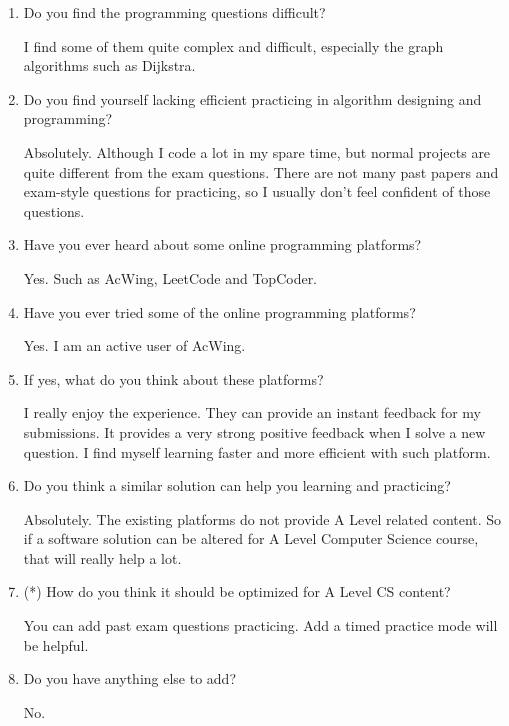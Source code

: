 \documentclass[a4paper]{report}
\begin{document}
\begin{enumerate}
    \item Do you find the programming questions difficult?

          I find some of them quite complex and difficult, especially the graph algorithms such as Dijkstra.

    \item Do you find yourself lacking efficient practicing in algorithm designing and programming?

          Absolutely. Although I code a lot in my spare time, but normal projects are quite different from the exam questions. There are not many past papers and exam-style questions for practicing, so I usually don't feel confident of those questions.

    \item Have you ever heard about some online programming platforms?

          Yes. Such as AcWing, LeetCode and TopCoder.

    \item Have you ever tried some of the online programming platforms?

          Yes. I am an active user of AcWing.

    \item If yes, what do you think about these platforms?

          I really enjoy the experience. They can provide an instant feedback for my submissions. It provides a very strong positive feedback when I solve a new question. I find myself learning faster and more efficient with such platform.

    \item Do you think a similar solution can help you learning and practicing?

          Absolutely. The existing platforms do not provide A Level related content. So if a software solution can be altered for A Level Computer Science course, that will really help a lot.

    \item (*) How do you think it should be optimized for A Level CS content?

          You can add past exam questions practicing. Add a timed practice mode will be helpful.

    \item Do you have anything else to add?

          No.
\end{enumerate}
\end{document}
